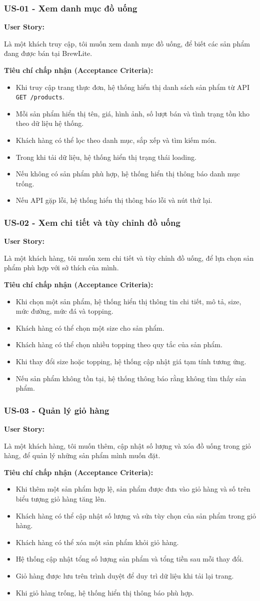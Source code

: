 \documentclass[12pt,a4paper]{article}
\newcommand{\userstory}[2]{%
  \noindent\textbf{User Story:}\par
  #1\par
  \hspace*{\parindent}\textbf{Tiêu chí chấp nhận (Acceptance Criteria):}
  \begin{itemize}
    #2
  \end{itemize}}
\begin{document}
\subsubsection{US-01 - Xem danh mục đồ uống}
\userstory{Là một khách truy cập, tôi muốn xem danh mục đồ uống, để biết các sản phẩm đang được bán tại BrewLite.}{
  \item Khi truy cập trang thực đơn, hệ thống hiển thị danh sách sản phẩm từ API \texttt{GET /products}.
  \item Mỗi sản phẩm hiển thị tên, giá, hình ảnh, số lượt bán và tình trạng tồn kho theo dữ liệu hệ thống.
  \item Khách hàng có thể lọc theo danh mục, sắp xếp và tìm kiếm món.
  \item Trong khi tải dữ liệu, hệ thống hiển thị trạng thái loading.
  \item Nếu không có sản phẩm phù hợp, hệ thống hiển thị thông báo danh mục trống.
  \item Nếu API gặp lỗi, hệ thống hiển thị thông báo lỗi và nút thử lại.
}

\subsubsection{US-02 - Xem chi tiết và tùy chỉnh đồ uống}
\userstory{Là một khách hàng, tôi muốn xem chi tiết và tùy chỉnh đồ uống, để lựa chọn sản phẩm phù hợp với sở thích của mình.}{
  \item Khi chọn một sản phẩm, hệ thống hiển thị thông tin chi tiết, mô tả, size, mức đường, mức đá và topping.
  \item Khách hàng có thể chọn một size cho sản phẩm.
  \item Khách hàng có thể chọn nhiều topping theo quy tắc của sản phẩm.
  \item Khi thay đổi size hoặc topping, hệ thống cập nhật giá tạm tính tương ứng.
  \item Nếu sản phẩm không tồn tại, hệ thống thông báo rằng không tìm thấy sản phẩm.
}

\subsubsection{US-03 - Quản lý giỏ hàng}
\userstory{Là một khách hàng, tôi muốn thêm, cập nhật số lượng và xóa đồ uống trong giỏ hàng, để quản lý những sản phẩm mình muốn đặt.}{
  \item Khi thêm một sản phẩm hợp lệ, sản phẩm được đưa vào giỏ hàng và số trên biểu tượng giỏ hàng tăng lên.
  \item Khách hàng có thể cập nhật số lượng và sửa tùy chọn của sản phẩm trong giỏ hàng.
  \item Khách hàng có thể xóa một sản phẩm khỏi giỏ hàng.
  \item Hệ thống cập nhật tổng số lượng sản phẩm và tổng tiền sau mỗi thay đổi.
  \item Giỏ hàng được lưu trên trình duyệt để duy trì dữ liệu khi tải lại trang.
  \item Khi giỏ hàng trống, hệ thống hiển thị thông báo phù hợp.
}
\end{document}
